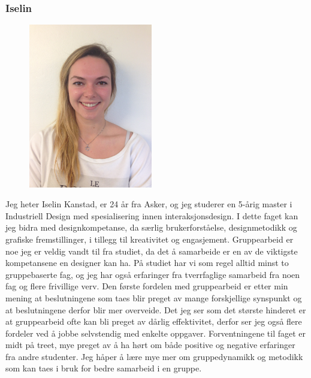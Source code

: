 \subsubsection{Iselin}
\begin{figure}
  \vspace{-20pt}
  \begin{center}
    \includegraphics[scale= 0.02, angle = 270, width=0.48\textwidth]{img_iselin.JPG}
  \end{center}
  \vspace{-20pt}
  \vspace{-10pt}
\end{figure}
Jeg heter Iselin Kanstad, er 24 år fra Asker, og jeg studerer en 5-årig master i Industriell Design med spesialisering innen interaksjonsdesign. I dette faget kan jeg bidra med designkompetanse, da særlig brukerforståelse, designmetodikk og grafiske fremstillinger, i tillegg til kreativitet og engasjement. Gruppearbeid er noe jeg er veldig vandt til fra studiet, da det å samarbeide er en av de viktigste kompetansene en designer kan ha. På studiet har vi som regel alltid minst to gruppebaserte fag, og jeg har også erfaringer fra tverrfaglige samarbeid fra noen fag og flere frivillige verv. Den første fordelen med gruppearbeid er etter min mening at beslutningene som taes blir preget av mange forskjellige synspunkt og at beslutningene derfor blir mer overveide. Det jeg ser som det største hinderet er at gruppearbeid ofte kan bli preget av dårlig effektivitet, derfor ser jeg også flere fordeler ved å jobbe selvstendig med enkelte oppgaver. Forventningene til faget er midt på treet, mye preget av å ha hørt om både positive og negative erfaringer fra andre studenter. Jeg håper å lære mye mer om gruppedynamikk og metodikk som kan taes i bruk for bedre samarbeid i en gruppe. 


